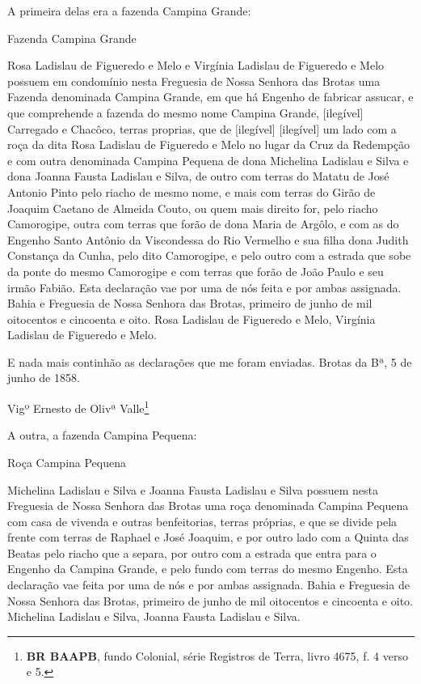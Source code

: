\begin{citacao}
A primeira delas era a fazenda Campina Grande:

\begin{citacao}
Fazenda Campina Grande

Rosa Ladislau de Figueredo e Melo e Virgínia Ladislau de Figueredo e Melo possuem em condomínio nesta Freguesia de Nossa Senhora das Brotas uma Fazenda denominada Campina Grande, em que há Engenho de fabricar assucar, e que comprehende a fazenda do mesmo nome Campina Grande, [ilegível] Carregado e Chacôco, terras proprias, que de [ilegível] [ilegível] um lado com a roça da dita Rosa Ladislau de Figueredo e Melo no lugar da Cruz da Redempção e com outra denominada Campina Pequena de dona Michelina Ladislau e Silva e dona Joanna Fausta Ladislau e Silva, de outro com terras do Matatu de José Antonio Pinto pelo riacho de mesmo nome, e mais com terras do Girão de Joaquim Caetano de Almeida Couto, ou quem mais direito for, pelo riacho Camorogipe, outra com terras que forão de dona Maria de Argôlo, e com as do Engenho Santo Antônio da Viscondessa do Rio Vermelho e sua filha dona Judith Constança da Cunha, pelo dito Camorogipe, e pelo outro com a estrada que sobe da ponte do mesmo Camorogipe e com terras que forão de João Paulo e seu irmão Fabião. Esta declaração vae por uma de nós feita e por ambas assignada. Bahia e Freguesia de Nossa Senhora das Brotas, primeiro de junho de mil oitocentos e cincoenta e oito. Rosa Ladislau de Figueredo e Melo, Virgínia Ladislau de Figueredo e Melo.

E nada mais continhão as declarações que me foram enviadas. Brotas da Bª, 5 de junho de 1858.

Vigº Ernesto de Olivª Valle\footnote{\textbf{BR BAAPB}, fundo Colonial, série Registros de Terra, livro 4675, f. 4 verso e 5.}
\end{citacao}

A outra, a fazenda Campina Pequena:

\begin{citacao}
Roça Campina Pequena

Michelina Ladislau e Silva e Joanna Fausta Ladislau e Silva possuem nesta Freguesia de Nossa Senhora das Brotas uma roça denominada Campina Pequena com casa de vivenda e outras benfeitorias, terras próprias, e que se divide pela frente com terras de Raphael e José Joaquim, e por outro lado com a Quinta das Beatas pelo riacho que a separa, por outro com a estrada que entra para o Engenho da Campina Grande, e pelo fundo com terras do mesmo Engenho. Esta declaração vae feita por uma de nós e por ambas assignada. Bahia e Freguesia de Nossa Senhora das Brotas, primeiro de junho de mil oitocentos e cincoenta e oito. Michelina Ladislau e Silva, Joanna Fausta Ladislau e Silva.


\end{citacao}
\end{citacao}
